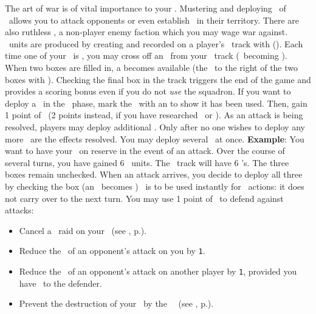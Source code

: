 The art of war is of vital importance to your \planet.  
Mustering and deploying \squadrons\ of \starships\ allows you to attack 
opponents or even establish \battleships\ in their territory.  There are also 
ruthless \pirates, a non-player enemy faction which you may wage war against.
\newline\newline
\military\ units are produced by creating \starships and recorded on a player's 
\military\ track with (\gainmilitarysymbol).  Each time one of your \starships\ 
is \activated, you may cross off an \astronaut\ from your \population\ track 
(\gainastronautsymbol\ becoming \useastronautsymbol).  When two boxes are filled
in, a \squadron becomes available (the \emptysquadron\ to the right of the two 
boxes with \gainmilitarysymbol).  Checking the final box in the track triggers 
the end of the game and provides a scoring bonus even if you do not \textit{use} 
the squadron.
\newline\newline
If you want to deploy a \squadron\ in the \deployment\ phase, mark the 
\emptysquadron\ with an \gainsquadron to show it has been used.  Then, gain 1 
point of \power\ (2 points instead, if you have researched \shields\ or 
\lasers).  
\newline\newline
As an attack is being resolved, players may deploy additional \squadrons.  Only 
after no one wishes to deploy any more \squadrons\ are the effects resolved. You
may deploy several \squadrons\ at once.
\newline\newline
\textbf{Example}: You want to have your \squadrons\ on reserve in the event of 
an attack.  Over the course of several turns, you have gained 6 \military\ 
units. The \military\ track will have 6 \gainmilitarysymbol's.  The three 
\emptysquadron boxes remain unchecked.  When an attack arrives, you decide to 
deploy all three \squadrons by checking the \squadron box (an \emptysquadron\ 
becomes \gainsquadron)
\newline\newline
\power\ is to be used instantly for \military\ actions: it does not carry over 
to the next turn.
\newline\newline
You may use 1 point of \power\ to defend against attacks:
\begin{itemize}
  \item Cancel a \pirate\ raid on your \planet\ (see , 
        p.\pageref{sec:disasters}).
  \item Reduce the \power\ of an opponent's attack on you by \texttt{1}.
  \item Reduce the \power\ of an opponent's attack on another player by 
        \texttt{1}, provided you have \reach\ to the defender.
  \item Prevent the destruction of your \starship\ by the \terrorism\ \disaster\
        (see , p.\pageref{sec:disasters}).
\end{itemize}
